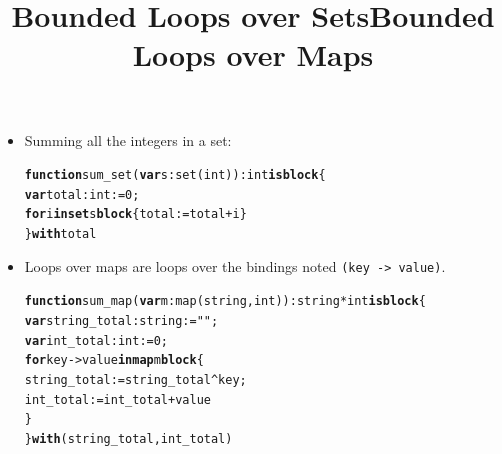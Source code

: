 \documentclass[wide]{slides}
\newcommand{\Kblock}[0]{\textbf{block}\xspace}
\newcommand{\Kfor}[0]{\textbf{for}\xspace}
\newcommand{\Kfunction}[0]{\textbf{function}\xspace}
\newcommand{\Kin}[0]{\textbf{in}\xspace}
\newcommand{\Kis}[0]{\textbf{is}\xspace}
\newcommand{\Kmap}[0]{\textbf{map}\xspace}
\newcommand{\Kset}[0]{\textbf{set}\xspace}
\newcommand{\Kvar}[0]{\textbf{var}\xspace}
\newcommand{\Kwith}[0]{\textbf{with}\xspace}
\begin{document}
\begin{slide}
  \title{Bounded Loops over Sets}

  \begin{itemize}

    \item Summing all the integers in a set:
      \begin{alltt}
\Kfunction sum_set (\Kvar s : set (int)) : int \Kis \Kblock \{
  \Kvar total : int := 0;
  \Kfor i \Kin \Kset s \Kblock \{ total := total + i \}
\} \Kwith total
      \end{alltt}

  \end{itemize}

\end{slide}

\begin{slide}
  \title{Bounded Loops over Maps}

  \begin{itemize}

  \item Loops over maps are loops over the bindings noted
      \texttt{(key -> value)}.
      \begin{alltt}
\Kfunction sum_map (\Kvar m : map (string,int)) : string*int \Kis \Kblock \{
  \Kvar string_total : string := "";
  \Kvar int_total : int := 0;
  \Kfor key -> value \Kin \Kmap m \Kblock \{
    string_total := string_total ^ key;
    int_total := int_total + value
  \}
\} \Kwith (string_total, int_total)
      \end{alltt}

  \end{itemize}

\end{slide}
\end{document}
